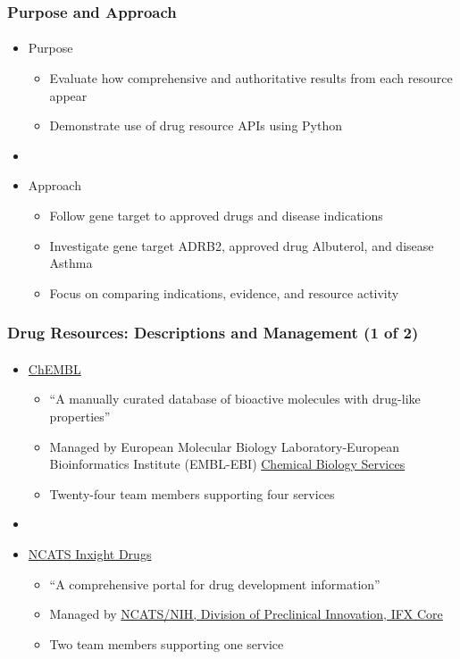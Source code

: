 \documentclass[aspectratio=169,xcolor=dvipsnames]{beamer}
\begin{document}
\begin{frame}
  \frametitle{Purpose and Approach}
  \framesubtitle{}
  \begin{itemize}
  \item[] Purpose
    \begin{itemize}
    \item Evaluate how comprehensive and authoritative results from
      each resource appear
    \item Demonstrate use of drug resource APIs using Python
    \end{itemize}
  \item[]
  \item[] Approach
    \begin{itemize}
    \item Follow gene target to approved drugs and disease indications
    \item Investigate gene target ADRB2, approved drug Albuterol, and
      disease Asthma
    \item Focus on comparing indications, evidence, and resource
      activity
    \end{itemize}
  \end{itemize}
\end{frame}

\begin{frame}
  \frametitle{Drug Resources: Descriptions and Management (1 of 2)}
  \framesubtitle{}
  \begin{itemize}
  \item[] \href{https://www.ebi.ac.uk/chembl/}{ChEMBL}
    \begin{itemize}
    \item ``A manually curated database of bioactive molecules with
      drug-like properties''
    \item Managed by European Molecular Biology Laboratory-European
      Bioinformatics Institute (EMBL-EBI)
      \href{https://www.ebi.ac.uk/about/teams/chemical-biology-services/}{Chemical
        Biology Services}
    \item Twenty-four team members supporting four services
    \end{itemize}
  \item[]
  \item[] \href{https://drugs.ncats.io/}{NCATS Inxight Drugs}
    \begin{itemize}
    \item ``A comprehensive portal for drug development information''
    \item Managed by \href{https://drugs.ncats.io/about}{NCATS/NIH,
      Division of Preclinical Innovation, IFX Core}
    \item Two team members supporting one service
    \end{itemize}
  \end{itemize}
\end{frame}
\end{document}
